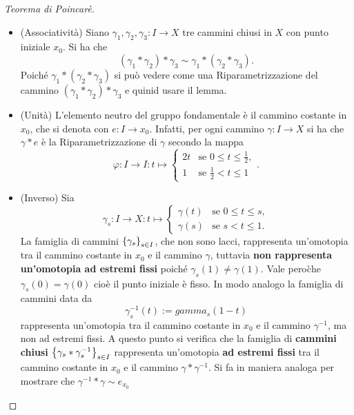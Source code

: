 \documentclass[]{article}
\begin{document}
    \begin{proof} [Teorema di Poincar\`e] \nl
        \begin{itemize}
            \item (Associatività) \nl
            Siano $\gamma_1, \gamma_2, \gamma_3: I \to X$ tre cammini chiusi in $X$ con punto iniziale $x_0$.
            Si ha che
            \[
                (\gamma_1 * \gamma_2) * \gamma_3 \sim \gamma_1 * (\gamma_2 * \gamma_3).
            \]
            Poich\'e $\gamma_1 * (\gamma_2 * \gamma_3)$ si pu\`o vedere come una Riparametrizzazione
            del cammino $(\gamma_1 * \gamma_2) * \gamma_3$ e quinid usare il lemma.
            \item (Unità) \nl
            L'elemento neutro del gruppo fondamentale è il cammino costante in $x_0$, che si denota con $e: I \to {x_0}$. \nl
            Infatti, per ogni cammino $\gamma: I \to X$ si ha che
            $\gamma * e $ \`e la Riparametrizzazione di $\gamma$ secondo la mappa
            \[
                \varphi: I \to I: t \mapsto \begin{cases}
                    2t & \text{se } 0 \leq t \leq \frac{1}{2}, \\
                    1 & \text{se } \frac{1}{2} < t \leq 1
                \end{cases}.
            \]
            \item (Inverso) \nl
            Sia 
            \[
                \gamma_s: I \to X: t \mapsto
                \begin{cases}
                    \gamma(t) & \text{se } 0 \leq t \leq s, \\
                    \gamma(s) & \text{se } s < t \leq 1.
                \end{cases}
            \]
            La famiglia di cammini $\left\{ \gamma_s \right\}_{s \in I}$, che non sono lacci, rappresenta un'omotopia tra il cammino costante in $x_0$ e il cammino 
            $\gamma$, tuttavia \textbf{non rappresenta un'omotopia ad estremi fissi} poiché $\gamma_s(1) \neq \gamma(1)$.
            Vale pero\` che $\gamma_s(0) = \gamma(0)$ cio\`e il punto iniziale \`e fisso. \nl
            In modo analogo la famiglia di cammini data da 
            \[
                \gamma_s^{-1}(t) := gamma_s(1-t) 
            \]
            rappresenta un'omotopia tra il cammino costante in $x_0$ e il cammino $\gamma^{-1}$, ma non ad estremi fissi. \nl
            A questo punto si verifica che la famiglia di \textbf{cammini chiusi} $\left\{ \gamma_s * \gamma_s^{-1} \right\}_{s \in I}$ rappresenta un'omotopia \textbf{ad estremi fissi} 
            tra il cammino costante in $x_0$ e il cammino $\gamma * \gamma^{-1}$. \nl
            Si fa in maniera analoga per mostrare che $\gamma^{-1} * \gamma \sim e_{x_0}$
        \end{itemize}
    \end{proof}
\end{document}
